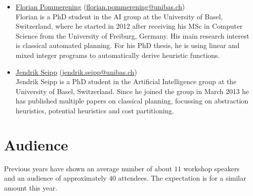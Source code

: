 \documentclass[10pt]{article}
\begin{document}
\begin{itemize}
\item \href{http://ai.cs.unibas.ch/people/pommeren}{Florian Pommerening}
  (\href{mailto:florian.pommerening@unibas.ch}{florian.pommerening@unibas.ch})\\
  Florian is a PhD student in the AI group at the University of Basel,
  Switzerland, where he started in 2012 after receiving his MSc in
  Computer Science from the University of Freiburg, Germany. His main
  research interest is classical automated planning. For his PhD
  thesis, he is using linear and mixed integer programs to
  automatically derive heuristic functions.

\item \href{http://ai.cs.unibas.ch/people/seipp}{Jendrik Seipp}
  (\href{mailto:jendrik.seipp@unibas.ch}{jendrik.seipp@unibas.ch})\\
  Jendrik Seipp is a PhD student in the Artificial Intelligence group
  at the University of Basel, Switzerland. Since he joined the group in
  March 2013 he has published multiple papers on classical planning,
  focussing on abstraction heuristics, potential heuristics and cost
  partitioning.


\end{itemize}

\section*{Audience}
Previous years have shown an average number of about $11$ workshop
speakers and an audience of approximately $40$ attendees. The
expectation is for a similar amount this year.
\end{document}
